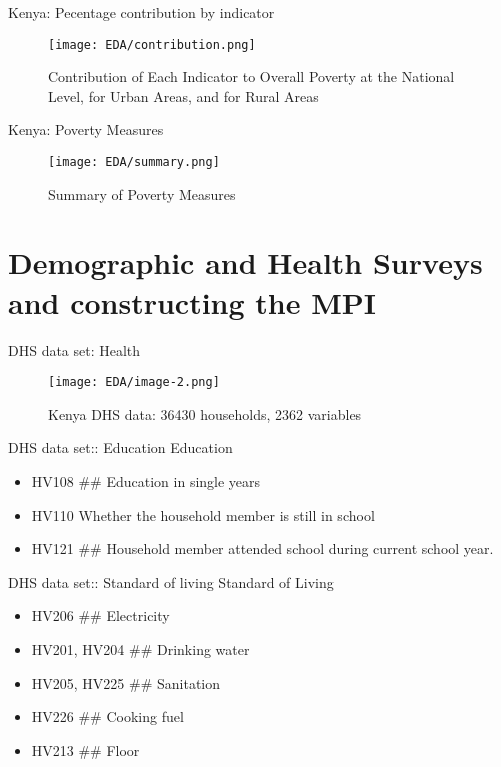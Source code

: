 \documentclass[10pt]{beamer}
\begin{document}
\begin{frame}{Kenya: Pecentage contribution by indicator}
   \begin{figure}
    \centering
    \texttt{[image: EDA/contribution.png]}
    \caption{Contribution of Each Indicator to Overall Poverty at the National Level, for Urban Areas, and for Rural Areas}
\end{figure}
\end{frame} 

\begin{frame}{Kenya: Poverty Measures}
   \begin{figure}
    \centering
    \texttt{[image: EDA/summary.png]}
    \caption{Summary of Poverty Measures}
\end{figure}
\end{frame}

\section{Demographic and Health Surveys and constructing the MPI}
\begin{frame}{DHS data set: Health}
 \begin{figure}
    \centering
    \texttt{[image: EDA/image-2.png]}
    \caption{Kenya DHS data: 36430 households, 2362 variables}
\end{figure}

\end{frame}

\begin{frame}{DHS data set:: Education}
    Education
\begin{itemize}
    \item HV108 ## Education in single years 
    \item  HV110 Whether the household member is still in school 
    \item  HV121 ## Household member attended school during current school year.
\end{itemize}
\end{frame}

\begin{frame}{DHS data set:: Standard of living}
    Standard of Living
\begin{itemize}
    
  \item   HV206 ## Electricity
 \item  HV201, HV204 ## Drinking water
 \item  HV205, HV225 ## Sanitation
\item   HV226 ## Cooking fuel
 \item  HV213 ## Floor
\end{itemize}
\end{frame}
\end{document}
